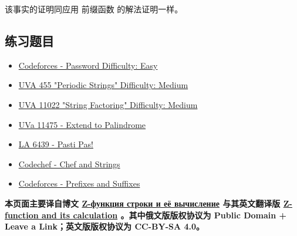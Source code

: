 该事实的证明同应用 前缀函数 的解法证明一样。

\subsection{练习题目}

\begin{itemize}
\item \href{http://codeforces.com/problemset/problem/126/B}{Codeforces - Password Difficulty: Easy}
\item \href{http://uva.onlinejudge.org/index.php?option=onlinejudge&page=show_problem&problem=396}{UVA 455 "Periodic Strings"  Difficulty: Medium}
\item \href{http://uva.onlinejudge.org/index.php?option=onlinejudge&page=show_problem&problem=1963}{UVA 11022 "String Factoring" Difficulty: Medium}
\item \href{http://uva.onlinejudge.org/index.php?option=com_onlinejudge&Itemid=8&category=24&page=show_problem&problem=2470}{UVa 11475 - Extend to Palindrome}
\item \href{https://icpcarchive.ecs.baylor.edu/index.php?option=com_onlinejudge&Itemid=8&category=588&page=show_problem&problem=4450}{LA 6439 - Pasti Pas!}
\item \href{https://www.codechef.com/problems/CHSTR}{Codechef - Chef and Strings}
\item \href{http://codeforces.com/problemset/problem/432/D}{Codeforces - Prefixes and Suffixes}
\end{itemize}

\hr

\textbf{本页面主要译自博文 \href{http://e-maxx.ru/algo/z_function}{Z-функция строки и её вычисление} 与其英文翻译版 \href{https://cp-algorithms.com/string/z-function.html}{Z-function and its calculation} 。其中俄文版版权协议为 Public Domain + Leave a Link；英文版版权协议为 CC-BY-SA 4.0。}
